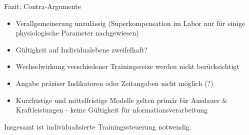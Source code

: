 Fazit: Contra-Argumente
\begin{itemize}
    \item Verallgemeinerung unzulässig (Superkompensation im Labor nur für einige physiologische Parameter nachgewiesen)
    \item Gültigkeit auf Individualebene zweifelhaft?
    \item Wechselwirkung verschiedener Trainingsreize werden nicht berücksichtigt
    \item Angabe präziser Indikatoren oder Zeitangaben nicht möglich (?)
    \item Kurzfristige und mittelfristige Modelle gelten primär für Ausdauer \& Kraftleistungen - keine Gültigkeit für nformationsverarbeitung
\end{itemize}

Insgesamt ist individualisierte Trainingssteuerung notwendig.
